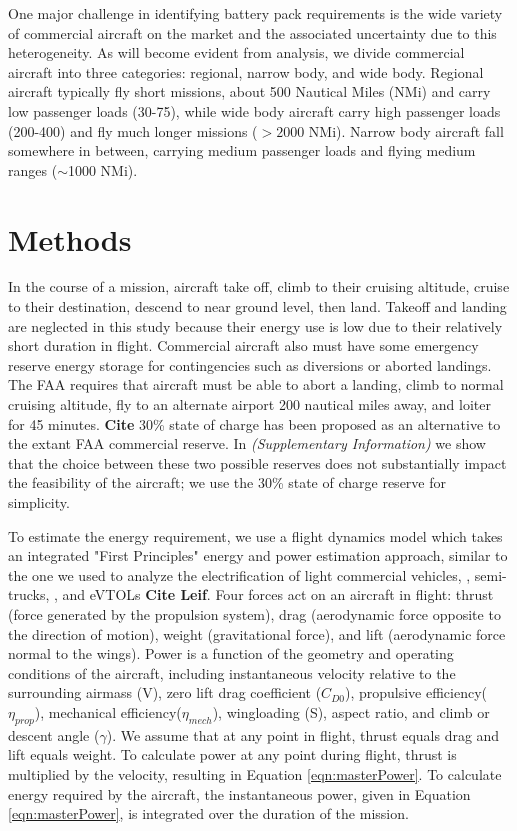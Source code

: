 \documentclass{achemso}
\begin{document}
One major challenge in identifying battery pack requirements is the wide variety of commercial aircraft on the market and the associated uncertainty due to this heterogeneity. As will become evident from analysis, we divide commercial aircraft into three categories: regional, narrow body, and wide body. Regional aircraft typically fly short missions, about 500 Nautical Miles (NMi) and carry low passenger loads (30-75), while wide body aircraft carry high passenger loads (200-400) and fly much longer missions ($>2000$ NMi). Narrow body aircraft fall somewhere in between, carrying medium passenger loads and flying medium ranges ($\sim$1000 NMi).


\section{Methods}

In the course of a mission, aircraft take off, climb to their cruising altitude, cruise to their destination, descend to near ground level, then land. Takeoff and landing are neglected in this study because their energy use is low due to their relatively short duration in flight. Commercial aircraft also must have some emergency reserve energy storage for contingencies such as diversions or aborted landings. The FAA requires that aircraft must be able to abort a landing, climb to normal cruising altitude, fly to an alternate airport 200 nautical miles away, and loiter for 45 minutes. \textbf{Cite} 30\% state of charge has been proposed as an alternative to the extant FAA commercial reserve. In \textit{(Supplementary Information)} we show that the choice between these two possible reserves does not substantially impact the feasibility of the aircraft; we use the 30\% state of charge reserve for simplicity. 

To estimate the energy requirement, we use a flight dynamics model which takes an integrated "First Principles" energy and power estimation approach, similar to the one we used to analyze the electrification of light commercial vehicles, \cite{sripad2017evaluation}, semi-trucks, \cite{guttenberg2017evaluating,sripad2017performance}, and eVTOLs \textbf{Cite Leif}. Four forces act on an aircraft in flight: thrust (force generated by the propulsion system), drag (aerodynamic force opposite to the direction of motion), weight (gravitational force), and lift (aerodynamic force normal to the wings). Power is a function of the geometry and operating conditions of the aircraft, including instantaneous velocity relative to the surrounding airmass (V), zero lift drag coefficient ($C_{D0}$), propulsive efficiency($\eta_{prop}$), mechanical efficiency($\eta_{mech}$), wingloading (S), aspect ratio, and climb or descent angle ($\gamma$).  We assume that at any point in flight, thrust equals drag and lift equals weight. To calculate power at any point during flight,  thrust is multiplied by the velocity, resulting in Equation \ref{eqn:masterPower}. To calculate energy required by the aircraft, the instantaneous power, given in Equation \ref{eqn:masterPower}, is integrated over the duration of the mission. 
\end{document}

